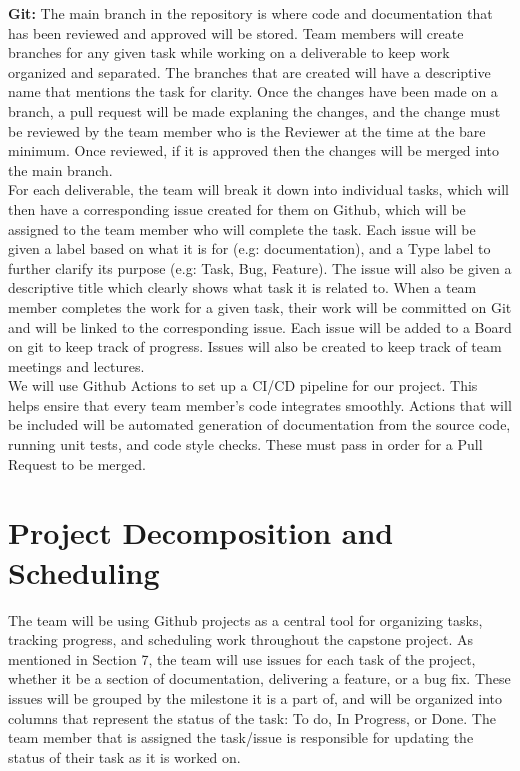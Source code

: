 \documentclass{article}
\begin{document}
{\bf Git:} The main branch in the repository is where code and documentation that has been reviewed and approved will be stored. Team members will create branches for any given task while working
on a deliverable to keep work organized and separated.  The branches that are created will have a descriptive name that mentions the task for clarity. Once the changes have been made on a branch, 
a pull request will be made explaning the changes, and the change must be reviewed by the team member who is the Reviewer at the time at the bare minimum. Once reviewed, if it is approved then the changes will be merged into the main branch. \\

 For each deliverable, the team will break it down into individual tasks, which will then have a corresponding issue created for them on Github, which will be assigned to the team member who will complete the task.
Each issue will be given a label based on what it is for (e.g: documentation), and a Type label to further clarify its purpose (e.g: Task, Bug, Feature). 
The issue will also be given a descriptive title which clearly shows what task it is related to. When a team member completes the work for a given task, their work will
be committed on Git and will be linked to the corresponding issue. Each issue will be added to a Board on git to keep track of progress. Issues will also be created to keep track of team meetings and lectures. \\

 We will use Github Actions to set up a CI/CD pipeline for our project. This helps ensire that every team member's code integrates smoothly. Actions that will be included will be
automated generation of documentation from the source code, running unit tests, and code style checks. These must pass in order for a Pull Request to be merged.
\section{Project Decomposition and Scheduling}

The team will be using Github projects as a central tool for organizing tasks, tracking progress, and scheduling work throughout the capstone project. As mentioned in Section 7,
the team will use issues for each task of the project, whether it be a section of documentation, delivering a feature, or a bug fix. These issues will be grouped by the milestone it
is a part of, and will be organized into columns that represent the status of the task: To do, In Progress, or Done. The team member that is assigned the task/issue is responsible
for updating the status of their task as it is worked on.\newline
\end{document}
